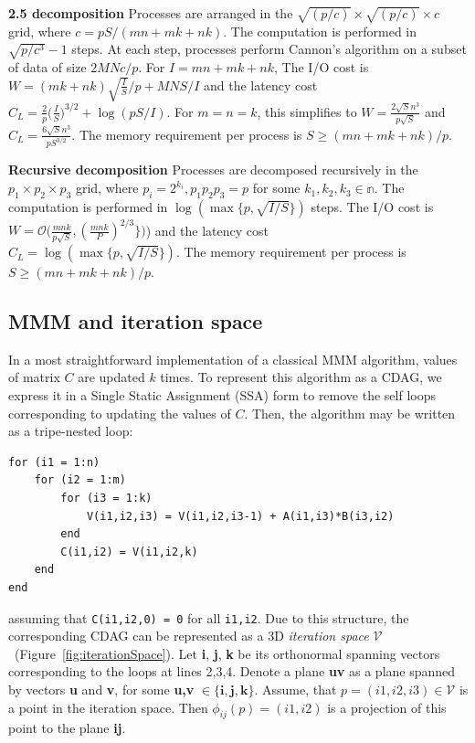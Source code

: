 \documentclass[sigplan,review,anonymous]{acmart}\settopmatter{printfolios=true,printccs=false,printacmref=false}
\newcommand{\macb}[1]{\textbf{\textsf{#1}}}
\begin{document}
\macb{2.5 decomposition} Processes are arranged in the $\sqrt{(p/c)} \times
\sqrt{(p/c)} \times c$ grid, where $c = pS/(mn + mk + nk)$. The computation is
performed in $\sqrt{p/c^3} - 1$ steps. At each step, processes perform
Cannon's algorithm on a subset of data of size $2MNc/p$. For $I= mn + mk +
nk$, The I/O cost is $W = (mk + nk)\sqrt{\frac{I}{S}}/p + MNS/I$
and the latency cost $C_L = \frac{2}{p}\big(\frac{I}{S}\big)^{3/2} +
\log(pS/I)$. For $m=n=k$, this simplifies to $W=
\frac{2\sqrt{S}n^3}{p\sqrt{S}}$ and $C_L =
\frac{6\sqrt{S}n^3}{pS^{3/2}}$. The memory requirement per process is $S \ge
(mn + mk + nk)/p$. 

\macb{Recursive decomposition}
%
Processes are decomposed recursively in the $p_1 \times p_2 \times p_3$ grid,
where $p_i = 2^{k_i}, p_1 p_2 p_3 = p$ for some $k_1, k_2, k_3 \in \mathbb{n}$.
The computation is performed in $\log (\max \{p,\sqrt{I/S} \})$ steps.  The
I/O cost is $W = \mathcal{O}\Big(\frac{mnk}{p\sqrt{S}},
\left(\frac{mnk}{P}\right)^{2/3} \Big\} \Big)$) and the latency cost \\ 
$C_L
= \log (\max \{p,\sqrt{I/S} \})$. The memory requirement per process is $S \ge
(mn + mk + nk)/p$. 


\subsection{MMM and iteration space}
\label{sec:iterationSpace}
In a most straightforward implementation of a classical MMM algorithm, values 
of matrix $C$ are updated $k$ times. To represent this algorithm as a CDAG, we 
express it in a Single Static Assignment (SSA) form to remove the self loops 
corresponding to updating the values of $C$. Then, the algorithm may be written 
as a tripe-nested loop:
\begin{lstlisting}[caption={A pseudocode of a classical MMM 
using the Single 
Static Assignment (SSA) form},label={lst:label}]
for (i1 = 1:n)
	for (i2 = 1:m)
		for (i3 = 1:k)
			V(i1,i2,i3) = V(i1,i2,i3-1) + A(i1,i3)*B(i3,i2) 
		end
		C(i1,i2) = V(i1,i2,k)
	end
end
\end{lstlisting}
assuming that \texttt{C(i1,i2,0) = 0} for all \texttt{i1,i2}.
Due to this structure, the corresponding CDAG can be represented as a 3D 
\emph{iteration 
space} $\mathcal{V}$~\cite{tiling}(Figure~\ref{fig:iterationSpace}). Let 
\textbf{i}, \textbf{j}, \textbf{k} be its
orthonormal spanning vectors corresponding to the loops at lines 2,3,4. 
Denote a plane \textbf{uv} as a plane spanned by vectors \textbf{u} and 
\textbf{v}, for some \textbf{u,v} $\in \{\mathbf{i,j,k}\}$. Assume, that $p = 
(i1,i2,i3) \in \mathcal{V}$ is a point in the iteration space. Then 
$\phi_{ij}(p) = (i1,i2)$ is a projection of this point to the plane \textbf{ij}.
\end{document}
